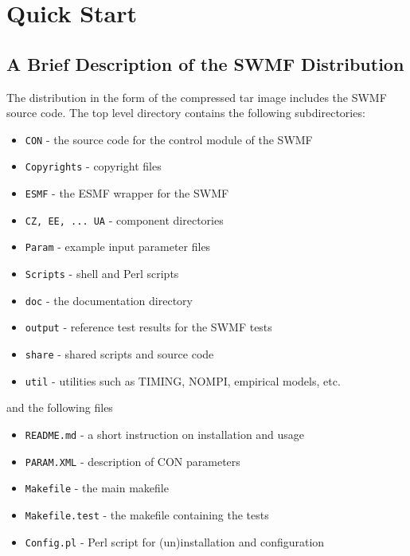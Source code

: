 
\chapter{Quick Start}

\section{A Brief Description of the SWMF Distribution}

The distribution in the form of the compressed tar image
includes the SWMF source code.
The top level directory contains the following subdirectories:
\begin{itemize}\itemsep=0pt
\item {\tt CON}     - the source code for the control module of the SWMF
\item {\tt Copyrights} - copyright files
\item {\tt ESMF}    - the ESMF wrapper for the SWMF
\item {\tt CZ, EE, ... UA} - component directories
\item {\tt Param}   - example input parameter files
\item {\tt Scripts} - shell and Perl scripts
\item {\tt doc}     - the documentation directory %
\item {\tt output}  - reference test results for the SWMF tests
\item {\tt share}   - shared scripts and source code
\item {\tt util}    - utilities such as TIMING, NOMPI, empirical models, etc.
\end{itemize}
and the following files
\begin{itemize}\itemsep=0pt
\item {\tt README.md}     - a short instruction on installation and usage
\item {\tt PARAM.XML}     - description of CON parameters
\item {\tt Makefile}      - the main makefile
\item {\tt Makefile.test} - the makefile containing the tests %
\item {\tt Config.pl}     - Perl script for (un)installation and configuration
\end{itemize}

